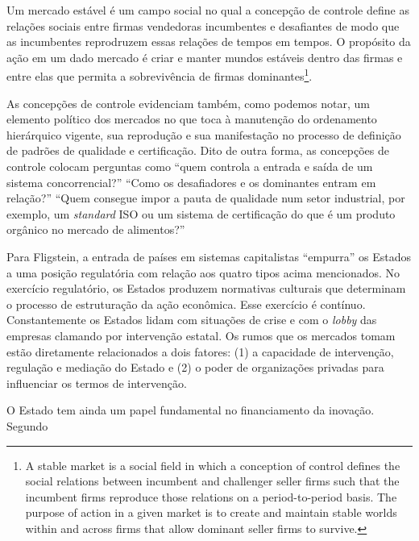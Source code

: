\documentclass[a4paper, 12pt, openright, oneside, german, french, english, brazil]{abntex2}
\begin{document}
	\begin{citacao}
		Um mercado estável é um campo social no qual a concepção de controle define as relações sociais entre firmas vendedoras incumbentes e desafiantes de modo que as incumbentes reprodruzem essas relações de tempos em tempos. O propósito da ação em um dado mercado é criar e manter mundos estáveis dentro das firmas e entre elas que permita a sobrevivência de firmas dominantes\footnote{A stable market is a social field in which a conception of control defines the social relations between incumbent and challenger seller firms such that the incumbent firms reproduce those relations on a period-to-period basis. The purpose of action in a given market is to create and maintain stable worlds within and across firms that allow dominant seller firms to survive.}. \cite[p. 35]{fligstein2002architecture}
	\end{citacao}

	As concepções de controle evidenciam também, como podemos notar, um elemento político dos mercados no que toca à manutenção do ordenamento hierárquico vigente, sua reprodução e sua manifestação no processo de definição de padrões de qualidade e certificação. Dito de outra forma, as concepções de controle colocam perguntas como ``quem controla a entrada e saída de um sistema concorrencial?'' ``Como os desafiadores e os dominantes entram em relação?'' ``Quem consegue impor a pauta de qualidade num setor industrial, por exemplo, um \textit{standard} ISO ou um sistema de certificação do que é um produto orgânico no mercado de alimentos?''

	Para Fligstein, a entrada de países em sistemas capitalistas ``empurra'' os Estados a uma posição regulatória com relação aos quatro tipos acima mencionados. No exercício regulatório, os Estados produzem normativas culturais que determinam o processo de estruturação da ação econômica. Esse exercício é contínuo. Constantemente os Estados lidam com situações de crise e com o \textit{lobby} das empresas clamando por intervenção estatal. Os rumos que os mercados tomam estão diretamente relacionados a dois fatores: (1) a capacidade de intervenção, regulação e mediação do Estado e (2) o poder de organizações privadas para influenciar os termos de intervenção.

	O Estado tem ainda um papel fundamental no financiamento da inovação. Segundo 
\end{document}
